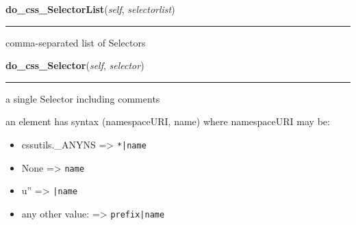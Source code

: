     \vspace{0.5ex}

\hspace{.8\funcindent}\begin{boxedminipage}{\funcwidth}

    \raggedright \textbf{do\_css\_SelectorList}(\textit{self}, \textit{selectorlist})

    \vspace{-1.5ex}

    \rule{\textwidth}{0.5\fboxrule}
\setlength{\parskip}{2ex}

comma-separated list of Selectors
\setlength{\parskip}{1ex}
    \end{boxedminipage}

    \label{cssutils:serialize:CSSSerializer:do_css_Selector}

    \vspace{0.5ex}

\hspace{.8\funcindent}\begin{boxedminipage}{\funcwidth}

    \raggedright \textbf{do\_css\_Selector}(\textit{self}, \textit{selector})

    \vspace{-1.5ex}

    \rule{\textwidth}{0.5\fboxrule}
\setlength{\parskip}{2ex}

a single Selector including comments

an element has syntax (namespaceURI, name) where namespaceURI may be:
\begin{itemize}
\item {} 
cssutils.{\_}ANYNS ={\textgreater} \texttt{*|name}

\item {} 
None ={\textgreater} \texttt{name}

\item {} 
u'' ={\textgreater} \texttt{|name}

\item {} 
any other value: ={\textgreater} \texttt{prefix|name}

\end{itemize}
\setlength{\parskip}{1ex}
    \end{boxedminipage}

    \label{cssutils:serialize:CSSSerializer:do_css_CSSStyleDeclaration}

